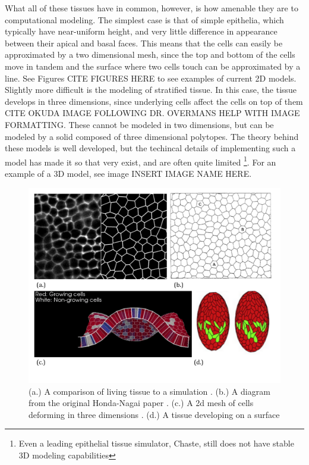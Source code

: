 What all of these tissues have in common, however, is how amenable they are to computational modeling. The simplest case is that of simple epithelia, which typically have near-uniform height, and very little difference in appearance between their apical and basal faces. This means that the cells can easily be approximated by a two dimensional mesh, since the top and bottom of the cells move in tandem and the surface where two cells touch can be approximated by a line. See Figures CITE FIGURES HERE to see examples of current 2D models.  Slightly more difficult is the modeling of stratified tissue. In this case, the tissue develops in three dimensions, since underlying cells affect the cells on top of them CITE OKUDA IMAGE FOLLOWING DR. OVERMANS HELP WITH IMAGE FORMATTING. These cannot be modeled in two dimensions, but can be modeled by a solid composed of three dimensional polytopes. The theory behind these models is well developed, but the techincal details of implementing such a model has made it so that very exist, and are often quite limited \footnote{Even a leading epithelial tissue simulator, Chaste, still does not have stable 3D modeling capabilities}. For an example of a 3D model, see image INSERT IMAGE NAME HERE.

\begin{figure}[h]
    \centering
    \includegraphics[width=\textwidth]{../diagrams/abcd3.pdf}
    \caption[Various Models of Epithelial Tissue]{(a.) A comparison of living tissue to a simulation \cite{Yoshi}. (b.) A diagram from the original Honda-Nagai paper \cite{HondaNagai}. (c.) A 2d mesh of cells deforming in three dimensions \cite{Okuda1}. (d.) A tissue developing on a surface \cite{VertexModels}}
    \label{fig:fourgraphs}
\end{figure}


